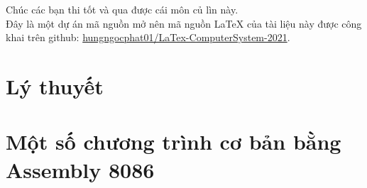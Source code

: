 \documentclass[12pt]{report}
\begin{document}
Chúc các bạn thi tốt và qua được cái môn {\tiny củ lìn} này.\\[1.5cm]

Đây là một dự án mã nguồn mở nên mã nguồn {\LaTeX} của tài liệu này được công khai trên github: \href{https://github.com/hungngocphat01/LaTex-ComputerSystem-2021}{hungngocphat01/LaTex-ComputerSystem-2021}.
\pagebreak

\renewcommand*\contentsname{Mục lục}
\setcounter{tocdepth}{2}
\tableofcontents
\pagebreak

\chapter{Lý thuyết} \label{chapterLyThuyet}
\pagebreak











\chapter{Một số chương trình cơ bản bằng Assembly 8086} \label{chapterBaiTap}



\renewcommand{\bibname}{Tài liệu tham khảo}
\nocite{htmt_lvl}
\nocite{jbwyatt}


\end{document}
